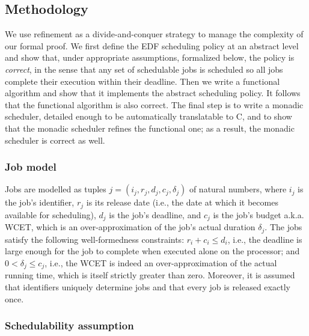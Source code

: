 	\subsection{Methodology}

	We use refinement %
	as a divide-and-conquer strategy to manage the complexity of our formal proof.
	We first define the EDF scheduling policy at an abstract level and show that,
	under appropriate assumptions, formalized below, the policy is \emph{correct},
	in the sense that any set of schedulable jobs is scheduled so all jobs complete
	their execution within their deadline. Then we write a functional algorithm and
	show that it implements the abstract scheduling policy. It follows that the functional
	algorithm is also correct. The final step is to write a monadic scheduler,
	detailed enough to be automatically translatable to C, and to show that
	the monadic scheduler refines the functional one; as a result, the monadic scheduler is correct as well.

	\subsubsection{Job model}
	\label{sec:jobmodel}
	Jobs are modelled as tuples $j = (i_j, r_j,d_j,c_j, \delta_j)$  of natural numbers, where $i_j$ is the job's identifier, $r_j$ is its release date (i.e., the date at which it becomes available for scheduling), $d_j$ is the job's deadline, and $c_j$ is the job's budget a.k.a. WCET, which is an over-approximation of the job's actual duration $\delta_j$. The jobs satisfy the following well-formedness constraints:
	$r_i + c_i \leq d_i$, i.e., the deadline is large enough for the job to complete when executed alone on the processor; and $0 < \delta_j \leq c_j$, i.e., the WCET is indeed an over-approximation of the actual running time, which is itself strictly greater than zero. Moreover, it is assumed that identifiers uniquely determine jobs and that every job is released exactly once.


	\subsubsection{Schedulability assumption}

